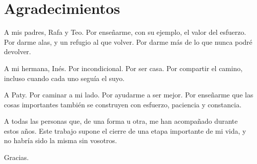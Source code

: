 \cleardoublepage

\chapter*{Agradecimientos}
\thispagestyle{empty}

A mis padres, Rafa y Teo. Por enseñarme, con su ejemplo, el valor del esfuerzo. Por darme alas, y un refugio al que volver. Por darme más de lo que nunca podré devolver.

A mi hermana, Inés. Por incondicional. Por ser casa. Por compartir el camino, incluso cuando cada uno seguía el suyo.

A Paty. Por caminar a mi lado. Por ayudarme a ser mejor. Por enseñarme que las cosas importantes también se construyen con esfuerzo, paciencia y constancia.

A todas las personas que, de una forma u otra, me han acompañado durante estos años. Este trabajo supone el cierre de una etapa importante de mi vida, y no habría sido la misma sin vosotros.

Gracias.